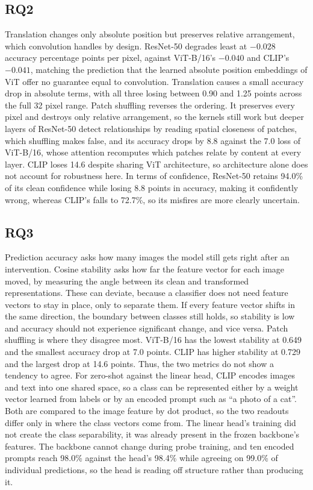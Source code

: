 \documentclass{article}
\begin{document}
\subsection{RQ2}

Translation changes only absolute position but preserves relative
arrangement, which convolution handles by design. ResNet-50 degrades least at
$-0.028$ accuracy percentage points per pixel, against ViT-B/16's $-0.040$
and CLIP's $-0.041$, matching the prediction that the learned absolute
position embeddings of ViT offer no guarantee equal to convolution.
Translation causes a small accuracy drop in absolute terms, with all three
losing between 0.90 and 1.25 points across the full 32 pixel range. Patch
shuffling reverses the ordering. It preserves every pixel and destroys only
relative arrangement, so the kernels still work but deeper layers of
ResNet-50 detect relationships by reading spatial closeness of patches, which
shuffling makes false, and its accuracy drops by 8.8 against the 7.0 loss of
ViT-B/16, whose attention recomputes which patches relate by content at every
layer. CLIP loses 14.6 despite sharing ViT architecture, so architecture
alone does not account for robustness here. In terms of confidence, ResNet-50
retains 94.0\% of its clean confidence while losing 8.8 points in accuracy,
making it confidently wrong, whereas CLIP's falls to 72.7\%, so its misfires
are more clearly uncertain.

\subsection{RQ3}

Prediction accuracy asks how many images the model still gets right after an
intervention. Cosine stability asks how far the feature vector for each image
moved, by measuring the angle between its clean and transformed
representations. These can deviate, because a classifier does not need
feature vectors to stay in place, only to separate them. If every feature
vector shifts in the same direction, the boundary between classes still
holds, so stability is low and accuracy should not experience significant
change, and vice versa. Patch shuffling is where they disagree most.
ViT-B/16 has the lowest stability at 0.649 and the smallest accuracy drop at
7.0 points. CLIP has higher stability at 0.729 and the largest drop at 14.6
points. Thus, the two metrics do not show a tendency to agree. For zero-shot
against the linear head, CLIP encodes images and text into one shared space,
so a class can be represented either by a weight vector learned from labels
or by an encoded prompt such as ``a photo of a cat''. Both are compared to
the image feature by dot product, so the two readouts differ only in where
the class vectors come from. The linear head's training did not create the
class separability, it was already present in the frozen backbone's features.
The backbone cannot change during probe training, and ten encoded prompts
reach 98.0\% against the head's 98.4\% while agreeing on 99.0\% of individual
predictions, so the head is reading off structure rather than producing it.
\end{document}
